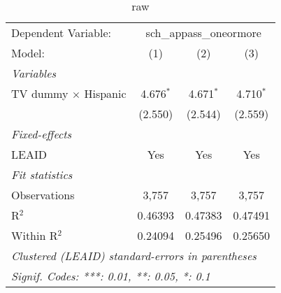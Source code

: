 \begin{table}[htbp]
\centering
\caption{ raw}
\begin{tabular}{lccc}
\tabularnewline\midrule\midrule
Dependent Variable:&\multicolumn{3}{c}{sch\_appass\_oneormore}\\
Model:&(1) & (2) & (3)\\
\midrule \emph{Variables}&   &   &  \\
TV dummy $\times$ Hispanic & 4.676$^{*}$ & 4.671$^{*}$ & 4.710$^{*}$\\
  &(2.550) & (2.544) & (2.559)\\
\midrule \emph{Fixed-effects}&   &   &  \\
LEAID & Yes & Yes & Yes\\
\midrule \emph{Fit statistics}&  & & \\
Observations & 3,757&3,757&3,757\\
R$^2$ & 0.46393&0.47383&0.47491\\
Within R$^2$ & 0.24094&0.25496&0.25650\\
\midrule\midrule\multicolumn{4}{l}{\emph{Clustered (LEAID) standard-errors in parentheses}}\\
\multicolumn{4}{l}{\emph{Signif. Codes: ***: 0.01, **: 0.05, *: 0.1}}\\
\end{tabular}
\end{table}

